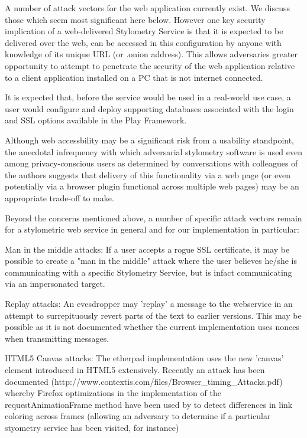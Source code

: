 \documentclass[letterpaper]{article}
\begin{document}
A number of attack vectors for the web application currently exist. We
discuss those which seem most significant here below. However one key
security implication of a web-delivered Stylometry Service is that it
is expected to be delivered over the web, can be accessed in this configuration by anyone with knowledge of its unique URL (or .onion
address). This allows adversaries greater opportunity to attempt to
penetrate the security of the web application relative to a client
application installed on a PC that is not internet connected.

It is expected that, before the service would be used in a real-world
use case, a user would configure and deploy supporting databases
associated with the login and SSL options available in the
Play Framework.

Although web accessbility may be a significant risk from a usability
standpoint, the anecdotal infrequency with which adversarial
stylometry software is used even among privacy-conscious users as
determined by conversations with colleagues of the authors
suggests that delivery of this functionality via a web page (or even
potentially via a browser plugin functional across multiple web pages)
may be an appropriate trade-off to make.

Beyond the concerns mentioned above, a number of specific attack
vectors remain for a stylometric web service in general and for our
implementation in particular:

Man in the middle attacks: If a user accepts a rogue SSL certificate, it
may be possible to create a "man in the middle" attack where the user
believes he/she is communicating with a specific Stylometry Service,
but is infact communicating via an impersonated target.

Replay attacks: An evesdropper may 'replay' a message to the
webservice in an attempt to surrepituously revert parts of the text to
earlier versions. This may be possible as it is not documented whether
the current implementation uses nonces when transmitting messages.

HTML5 Canvas attacks: The etherpad implementation uses the new
'canvas' element introduced in HTML5 extensively. Recently an attack
has been documented
(http://www.contextis.com/files/Browser_timing_Attacks.pdf) whereby
Firefox optimizations in the implementation of the
requestAnimationFrame method have been used by to detect differences
in link coloring across frames (allowing an adversary to determine if
a particular styometry service has been visited, for instance)
\end{document}
